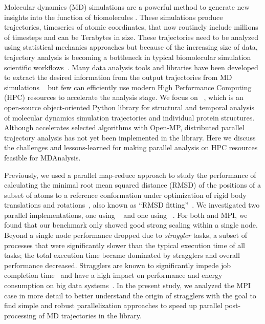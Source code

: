 \label{sec:introduction}
Molecular dynamics (MD) simulations are a powerful method to generate new insights into the function of biomolecules \citep{Borhani:2012mi, Dror:2012cr, Orozco:2014dq, Perilla:2015kx, Bottaro:2018aa}.
These simulations produce trajectories, timeseries of atomic coordinates, that now routinely include millions of timesteps and can be Terabytes in size.
These trajectories need to be analyzed using statistical mechanics approaches \cite{Mura:2014kx} but because of the increasing size of data, trajectory analysis is becoming a bottleneck in typical biomolecular simulation scientific workflows~\cite{Cheatham:2015}.
Many data analysis tools and libraries have been developed to extract the desired information from the output trajectories from MD simulations ~\cite{nmoldyn, nmoldyn-2012, Hum96, Hinsen:2000kx, Grant:2006ud, himach-2008, Romo:2009zr, Romo:2014bh, Michaud-Agrawal:2011fu, Gowers:2016aa, cpptraj-2013, mdtraj-2015, pteros2015, Doerr:2016aa} but few can efficiently use modern High Performance Computing (HPC) resources to accelerate the analysis stage.
We focus on ~\citep{Gowers:2016aa,Michaud-Agrawal:2011fu}, which is an open-source object-oriented Python library for structural and temporal analysis of molecular dynamics simulation trajectories and individual protein structures.
Although  accelerates selected algorithms with Open-MP, distributed parallel trajectory analysis has not yet been implemented in the library.
Here we discuss the challenges and lessons-learned for making parallel analysis on HPC resources feasible for MDAnalysis.

Previously, we used a parallel map-reduce approach to study the performance of calculating the minimal root mean squared distance (RMSD) of the positions of a subset of atoms to a reference conformation under optimization of rigid body translations and rotations~\cite{Khoshlessan:2017ab, ICCP-2018}, also known as ``RMSD fitting''~\cite{Liu:2010kx, Mura:2014kx}. 
We investigated two parallel implementations, one using ~\cite{Rocklin:2015aa} and one using ~\cite{Dalcin:2011aa, Dalcin:2005aa}. 
For both  and MPI, we found that our benchmark only showed good strong scaling within a single node.
Beyond a single node performance dropped due to \emph{straggler} tasks, a subset of processes that were significantly slower than the typical execution time of all tasks; the total execution time became dominated by stragglers and overall performance decreased.
Stragglers are known to significantly impede job completion time~\cite{Garraghan2016} and have a high impact on performance and energy consumption on big data systems~\cite{Tien-2017}.
In the present study, we analyzed the MPI case in more detail to better understand the origin of stragglers with the goal to find simple and robust parallelization approaches to speed up parallel post-processing of MD trajectories in the  library.

